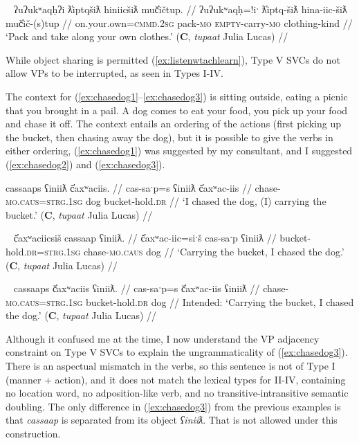 \ex~ \label{ex:packandtake}
\begingl
\glpreamble ʔuʔukʷaqḥʔi ƛ̓iptqšiƛ hiniicšiƛ muč̓ičtup. //
\gla ʔuʔukʷaqḥ=!iˑ ƛ̓iptq-šiƛ hina-iic-šiƛ muč̓ič-(s)tup //
\glb on.your.own=\textsc{cmmd.2sg} pack-\textsc{mo} \textsc{empty}-carry-\textsc{mo} clothing-kind //
\glft `Pack and take along your own clothes.' (\textbf{C}, \textit{tupaat} Julia Lucas) //
\endgl
\xe

While object sharing is permitted (\ref{ex:listenwtachlearn}), Type V SVCs do not allow VPs to be interrupted, as seen in Types I-IV.

The context for (\ref{ex:chasedog1}--\ref{ex:chasedog3}) is sitting outside, eating a picnic that you brought in a pail. A dog comes to eat your food, you pick up your food and chase it off. The context entails an ordering of the actions (first picking up the bucket, then chasing away the dog), but it is possible to give the verbs in either ordering, (\ref{ex:chasedog1}) was suggested by my consultant, and I suggested (\ref{ex:chasedog2}) and (\ref{ex:chasedog3}). 

\ex \label{ex:chasedog1}
\begingl
\glpreamble cassaaps ʕiniiƛ č̓axʷaciis. //
\gla cas-saˑp=s ʕiniiƛ č̓axʷac-iis //
\glb chase-\textsc{mo.caus}=\textsc{strg.1sg} dog bucket-hold.\textsc{dr} //
\glft `I chased the dog, (I) carrying the bucket.' (\textbf{C}, \textit{tupaat} Julia Lucas) //
\endgl
\xe

\ex~ \label{ex:chasedog2}
\begingl
\glpreamble č̓axʷaciicsiš cassaap ʕiniiƛ. //
\gla č̓axʷac-iic=siˑš cas-saˑp ʕiniiƛ //
\glb bucket-hold.\textsc{dr}=\textsc{strg.1sg} chase-\textsc{mo.caus} dog //
\glft `Carrying the bucket, I chased the dog.' (\textbf{C}, \textit{tupaat} Julia Lucas) //
\endgl
\xe

\ex~ \label{ex:chasedog3}
\begingl
\glpreamble *cassaaps č̓axʷaciis ʕiniiƛ. //
\gla cas-saˑp=s č̓axʷac-iis ʕiniiƛ //
\glb chase-\textsc{mo.caus}=\textsc{strg.1sg} bucket-hold.\textsc{dr} dog //
\glft Intended: `Carrying the bucket, I chased the dog.' (\textbf{C}, \textit{tupaat} Julia Lucas) //
\endgl
\xe

Although it confused me at the time, I now understand the VP adjacency constraint on Type V SVCs to explain the ungrammaticality of (\ref{ex:chasedog3}). There is an aspectual mismatch in the verbs, so this sentence is not of Type I (manner + action), and it does not match the lexical types for II-IV, containing no location word, no adposition-like verb, and no transitive-intransitive semantic doubling. The only difference in (\ref{ex:chasedog3}) from the previous examples is that \textit{cassaap} is separated from its object \textit{ʕiniiƛ}. That is not allowed under this construction.

